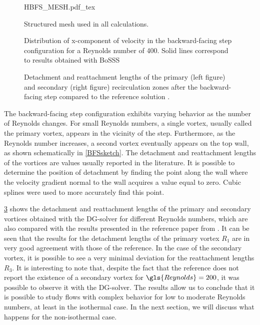 \begin{figure}[tb]
	\begin{center}
		\def\svgwidth{0.8\textwidth}
		{HBFS_MESH.pdf_tex}
		\caption{Structured mesh used in all calculations. }
		\label{bfsmesh}
	\end{center}
\end{figure}

\begin{figure}[bt]
	\centering
	\caption{Distribution of x-component of velocity in the backward-facing step configuration for a Reynolds number of 400. Solid lines correspond to results obtained with BoSSS}
	\label{fig:uvelBFS}
\end{figure}



\begin{figure}[tb]
	\centering
	\caption{ Detachment and reattachment lengths of the primary (left figure) and secondary (right figure) recirculation zones after the backward-facing step compared to the reference solution \citep{biswasBackwardFacingStepFlows2004}.}
	\label{fig:Re_De_Attachmentlengths}
\end{figure}
The backward-facing step configuration exhibits varying behavior as the number of Reynolds changes. For small Reynolds numbers, a single vortex, usually called the primary vortex, appears in the vicinity of the step. Furthermore, as the Reynolds number increases, a second vortex eventually appears on the top wall, as shown schematically in \cref{BFSsketch}.
The detachment and reattachment lengths of the vortices are values usually reported in the literature. It is possible to determine the position of detachment by finding the point along the wall where the velocity gradient normal to the wall acquires a value equal to zero. Cubic splines were used to more accurately find this point.

\cref{fig:Re_De_Attachmentlengths} shows the detachment and reattachment lengths of the primary and secondary vortices obtained with the DG-solver for different Reynolds numbers, which are also compared with the results presented in the reference paper from \cite{biswasBackwardFacingStepFlows2004}. It can be seen that the results for the detachment lengths of the primary vortex $R_1$ are in very good agreement with those of the reference. In the case of the secondary vortex, it is possible to see a very minimal deviation for the reattachment lengths $R_3$. It is interesting to note that, despite the fact that the reference does not report the existence of a secondary vortex for $\gls{Reynolds} = 200$, it was possible to observe it with the DG-solver. The results allow us to conclude that it is possible to study flows with complex behavior for low to moderate Reynolds numbers, at least in the isothermal case. In the next section, we will discuss what happens for the non-isothermal case.

